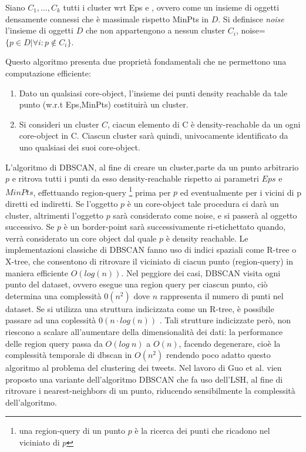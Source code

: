 \begin{definizione}[noise]
\label{def:noise}
Siano $C_1,\dots,C_k$ tutti i cluster wrt Eps e , ovvero come un insieme di oggetti densamente connessi che è massimale rispetto MinPts in $D$. Si definisce \emph{noise}  l'insieme di oggetti $D$ che non appartengono a nessun cluster $C_i$,
noise=$\lbrace p\in D | \forall i: p \notin C_i \rbrace $.
 
\end{definizione}
Questo algoritmo presenta due proprietà fondamentali che ne permettono una computazione efficiente:
\begin{enumerate}
\item Dato un qualsiasi core-object, l'insieme dei punti density reachable da tale punto (w.r.t Eps,MinPts) costituirà un cluster.
\item  Si consideri un cluster $C$, ciacun elemento di C è density-reachable da  un ogni core-object in C. Ciascun cluster sarà quindi, univocamente identificato da uno qualsiasi dei suoi core-object.
\end{enumerate}

L'algoritmo di DBSCAN, al fine di creare un cluster,parte da un punto arbitrario $p$ e ritrova tutti i punti da esso density-reachable rispetto ai parametri $Eps$ e $MinPts$, effettuando region-query \footnote{una region-query  di un punto $p$ è la ricerca dei punti che ricadono nel viciniato di $p$} prima per $p$ ed eventualmente per i vicini di p diretti ed indiretti.
Se l'oggetto $p$ è un core-object tale procedura ci darà un cluster, altrimenti l'oggetto $p$ sarà considerato come noise, e si passerà al oggetto successivo. Se $p$ è un border-point sarà successivamente ri-etichettato quando, verrà considerato un core object dal quale $p$ è density reachable.
Le implementazioni classiche di DBSCAN fanno uso di indici spaziali come R-tree o X-tree, che consentono di ritrovare il viciniato di ciacun punto (region-query) in maniera efficiente $O(log(n))$. Nel peggiore dei casi, DBSCAN visita ogni punto del dataset, ovvero esegue una region query per ciascun punto, ciò determina una complessità $0(n^2)$  dove $n$ rappresenta il numero di punti nel dataset. Se si utilizza una struttura indicizzata come un R-tree, è possibile passare ad una coplessità $0(n \cdot log(n))$ . 
Tali strutture indicizzate però, non riescono a scalare all'aumentare della dimensionalità dei dati: la performance delle region query passa da  $O(log\;n)$ a   $O(n)$, facendo degenerare, cioè la complessità temporale di dbscan in $O(n^2)$ rendendo poco adatto questo algoritmo al problema del clustering dei tweets. Nel lavoro di Guo et al. \cite{4370588} vien proposto una variante dell'algoritmo DBSCAN che fa uso dell'LSH, al fine di ritrovare i nearest-neighbors di un punto, riducendo sensibilmente la complessità dell'algoritmo.
 
